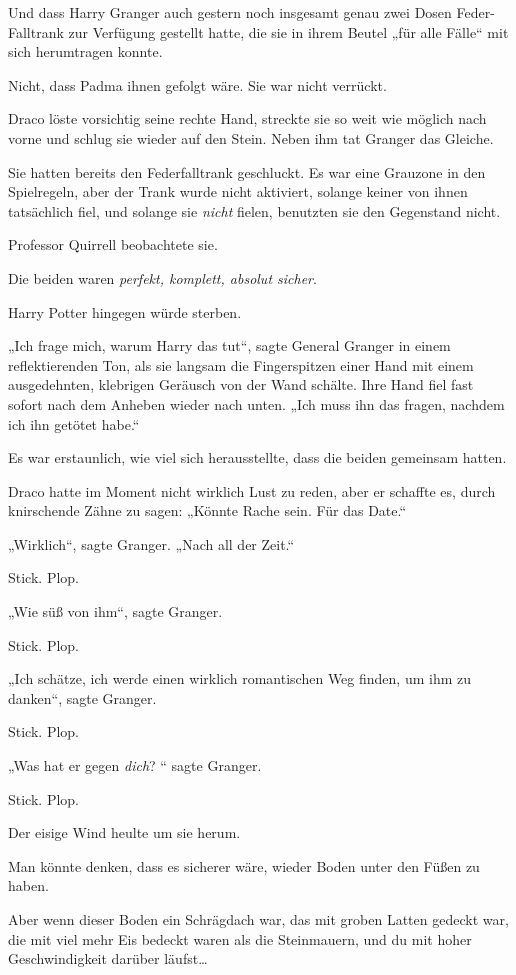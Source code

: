{Und dass Harry Granger auch gestern noch insgesamt genau zwei Dosen Feder-Falltrank zur Verfügung gestellt hatte, die sie in ihrem Beutel „für alle Fälle“ mit sich herumtragen konnte.

Nicht, dass Padma ihnen gefolgt wäre. Sie war nicht verrückt.

Draco löste vorsichtig seine rechte Hand, streckte sie so weit wie möglich nach vorne und schlug sie wieder auf den Stein. Neben ihm tat Granger das Gleiche.

Sie hatten bereits den Federfalltrank geschluckt. Es war eine Grauzone in den Spielregeln, aber der Trank wurde nicht aktiviert, solange keiner von ihnen tatsächlich fiel, und solange sie \emph{nicht} fielen, benutzten sie den Gegenstand nicht.

Professor Quirrell beobachtete sie.

Die beiden waren \emph{perfekt, komplett, absolut sicher}.

Harry Potter hingegen würde sterben.

„Ich frage mich, warum Harry das tut“, sagte General Granger in einem reflektierenden Ton, als sie langsam die Fingerspitzen einer Hand mit einem ausgedehnten, klebrigen Geräusch von der Wand schälte. Ihre Hand fiel fast sofort nach dem Anheben wieder nach unten. „Ich muss ihn das fragen, nachdem ich ihn getötet habe.“

Es war erstaunlich, wie viel sich herausstellte, dass die beiden gemeinsam hatten.

Draco hatte im Moment nicht wirklich Lust zu reden, aber er schaffte es, durch knirschende Zähne zu sagen: „Könnte Rache sein. Für das Date.“

„Wirklich“, sagte Granger. „Nach all der Zeit.“

Stick. Plop.

„Wie süß von ihm“, sagte Granger.

Stick. Plop.

„Ich schätze, ich werde einen wirklich romantischen Weg finden, um ihm zu danken“, sagte Granger.

Stick. Plop.

„Was hat er gegen \emph{dich}? “ sagte Granger.

Stick. Plop.

Der eisige Wind heulte um sie herum.

Man könnte denken, dass es sicherer wäre, wieder Boden unter den Füßen zu haben.

Aber wenn dieser Boden ein Schrägdach war, das mit groben Latten gedeckt war, die mit viel mehr Eis bedeckt waren als die Steinmauern, und du mit hoher Geschwindigkeit darüber läufst…

}
